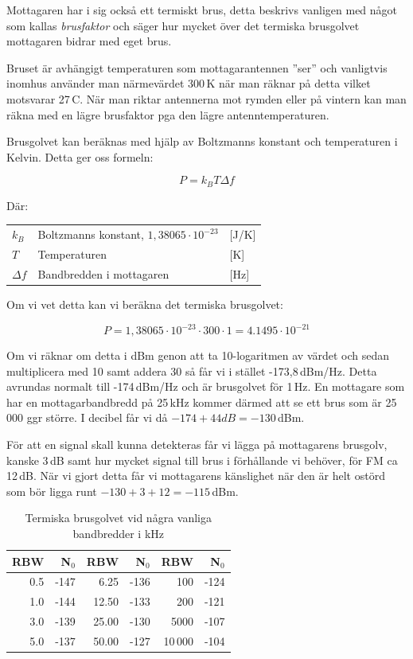 Mottagaren har i sig också ett termiskt brus, detta beskrivs vanligen med
något som kallas \textit{brusfaktor} och säger hur mycket över det termiska
brusgolvet mottagaren bidrar med eget brus.

Bruset är avhängigt temperaturen som mottagarantennen ''ser'' och vanligtvis
inomhus använder man närmevärdet 300\,K när man räknar på detta vilket
motsvarar 27\,\textdegree C. När man riktar antennerna mot rymden eller på
vintern kan man räkna med en lägre brusfaktor pga den lägre
antenntemperaturen.

Brusgolvet kan beräknas med hjälp av Boltzmanns konstant och temperaturen i
Kelvin. Detta ger oss formeln:

\begin{equation}
	P=k_BT\Delta f
\end{equation}

Där:

\begin{tabular}{lll}
	$k_B$      & Boltzmanns konstant, $1,38065\cdot 10^{-23}$ & [J/K] \\
	$T$        & Temperaturen                                 & [K]   \\
	$\Delta f$ & Bandbredden i mottagaren                     & [Hz]
\end{tabular}

Om vi vet detta kan vi beräkna det termiska brusgolvet:

$$P = 1,38065\cdot 10^{-23} \cdot 300 \cdot 1 = 4.1495\cdot 10^{-21}$$

Om vi räknar om detta i dBm genon att ta 10-logaritmen av värdet och sedan
multiplicera med 10 samt addera 30 så får vi i stället -173,8\,dBm/Hz. Detta
avrundas normalt till -174\,dBm/Hz och är brusgolvet för 1\,Hz. En mottagare som
har en mottagarbandbredd på 25\,kHz kommer därmed att se ett brus som är
25\,000 ggr större. I decibel får vi då $-174 + 44 dB = -130$\,dBm.

För att en signal skall kunna detekteras får vi lägga på mottagarens brusgolv,
kanske 3\,dB samt hur mycket signal till brus i förhållande vi behöver, för FM
ca 12\,dB. När vi gjort detta får vi mottagarens känslighet när den är helt
ostörd som bör ligga runt $-130 + 3 + 12 = -115$\,dBm.

\begin{table}[H]
\centering
\begin{tabular}{rr|rr|rr}
	\textbf{RBW} & \textbf{N$_0$} & \textbf{RBW} & \textbf{N$_0$} & \textbf{RBW} & \textbf{N$_0$} \\ \hline
	         0.5 &           -147 &         6.25 &           -136 &          100 &           -124 \\
	         1.0 &           -144 &        12.50 &           -133 &          200 &           -121 \\
	         3.0 &           -139 &        25.00 &           -130 &         5000 &           -107 \\
	         5.0 &           -137 &        50.00 &           -127 &        10\,000 &           -104
\end{tabular}
\caption{Termiska brusgolvet vid några vanliga bandbredder i kHz}
\end{table}

